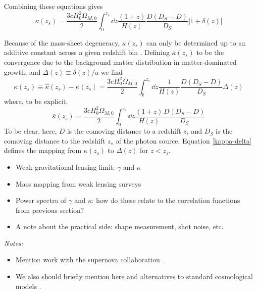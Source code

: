 Combining these equations gives
\begin{equation}
  \kappa(z_s) = \frac{3cH_0^2\Omega_{M,0}}{2}\int_0^{z_s} \dd z \frac{(1+z)}{H(z)} \frac{D(D_S-D)}{D_S}\big[1+\delta(z)\big]
\end{equation}

Because of the mass-sheet degeneracy, $\kappa(z_s)$ can only be determined
up to an additive constant across a given redshift bin
\citep[see][for discussion]{seitz_schneider1996}.
Defining $\bar{\kappa}(z_s)$ to be the convergence due to the background
matter distribution in matter-dominated growth,
and $\Delta(z) \equiv \delta(z)/a$ we find
\begin{equation}
  \label{kappa-delta}
  \kappa(z_s) \equiv \hat{\kappa}(z_s)-\bar\kappa(z_s) = 
  \frac{3cH_0^2\Omega_{M,0}}{2}\int_0^{z_s} \dd z 
  \frac{1}{H(z)} \frac{D(D_S-D)}{D_S}\Delta(z)
\end{equation}
where, to be explicit,
\begin{equation}
  \bar\kappa(z_s) = \frac{3cH_0^2\Omega_{M,0}}{2}\int_0^{z_s} \dd z 
  \frac{(1+z)}{H(z)} \frac{D(D_S-D)}{D_S}
\end{equation}
To be clear, here, $D$ is the comoving distance to a redshift $z$,
and $D_S$ is the comoving distance to the redshift $z_s$ of the photon
source.  Equation \ref{kappa-delta} defines the mapping from $\kappa(z_s)$
to $\Delta(z)$ for $z<z_s$. 

\begin{itemize}
  \item Weak gravitational lensing limit: $\gamma$ and $\kappa$
  \item Mass mapping from weak lensing surveys
  \item Power spectra of $\gamma$ and $\kappa$: how do these relate to
    the correlation functions from previous section?
  \item A note about the practical side: shape measurement, shot noise,
    etc.
\end{itemize}

{\it Notes:}
\begin{itemize}
  \item Mention work with the supernova collaboration \citep{Kessler2009}.
  \item We also should briefly mention here \cite{Jain2011} and alternatives
    to standard cosmological models \citep[also][]{Sollerman2009}.
\end{itemize}
